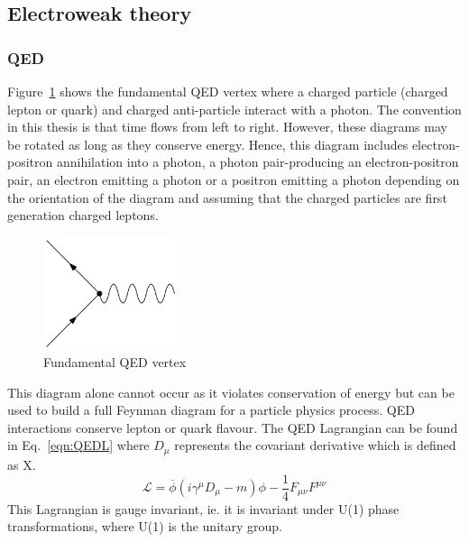 \subsection{Electroweak theory}

\subsubsection{QED}
\label{subsec:QED}

Figure~\ref{fig:QEDvertex} shows the fundamental QED vertex where a charged particle (charged lepton or quark) and charged anti-particle interact with a photon. The convention in this thesis is that time flows from left to right. However, these diagrams may be rotated as long as they conserve energy. Hence, this diagram includes electron-positron annihilation into a photon, a photon pair-producing an electron-positron pair, an electron emitting a photon or a positron emitting a photon depending on the orientation of the diagram and assuming that the charged particles are first generation charged leptons. 

\begin{figure}[ht!]
\begin{center}
    \includegraphics[width=0.35\textwidth]{images/Theory/QEDvertex.png}
    \caption{Fundamental QED vertex}
    \label{fig:QEDvertex}
\end{center}
\end{figure}

This diagram alone cannot occur as it violates conservation of energy but can be used to build a full Feynman diagram for a particle physics process. QED interactions conserve lepton or quark flavour. 
The QED Lagrangian can be found in Eq.~\ref{eqn:QEDL} where $D_{\mu}$ represents the covariant derivative which is defined as X. 
\begin{equation}
\mathcal{L} = \overline{\phi}\left(i\gamma^{\mu}D_{\mu}-m\right)\phi - \frac{1}{4}F_{\mu\nu}F^{\mu\nu}
\label{eqn:QEDL}
\end{equation}
This Lagrangian is gauge invariant, ie. it is invariant under U(1) phase transformations, where U(1) is the unitary group.

